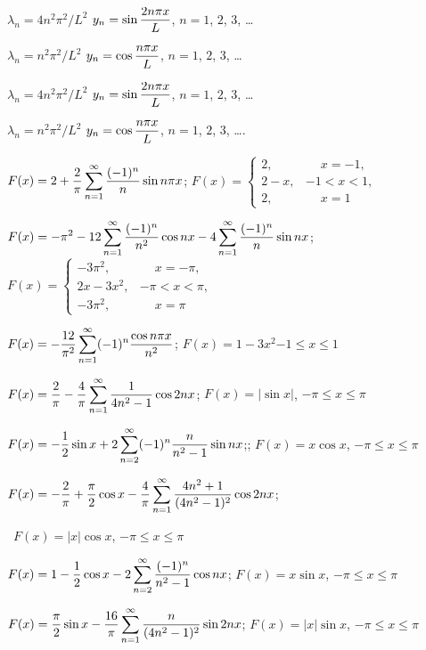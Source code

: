 $\lambda_n=4n^2\pi^2/L^2$   $y_n=\displaystyle\sin\frac{2n\pi x}{L}$,
$n=1$, $2$, $3$, \dots


$\lambda_n=n^2\pi^2/L^2$    $y_n=\displaystyle\cos\frac{ n\pi x}{L}$,
$n=1$, $2$, $3$, \dots

$\lambda_n=4n^2\pi^2/L^2$    $y_n=\displaystyle\sin\frac{2n\pi x}{L}$,
$n=1$, $2$, $3$, \dots

$\lambda_n=n^2\pi^2/L^2$    $y_n=\displaystyle\cos\frac{n\pi
x}{L}$, $n=1$, $2$, $3$, \dots.



$F(x)=\displaystyle2+\frac{2}{\pi}\sum_{n=1}^\infty\frac{(-1)^n}{n}\sin n\pi x$;  \quad
$F(x)=
\begin{cases}
2,&\phantom{-}x=-1,\\2-x,&-1<x<1,\\2,&\phantom{-}x=1
\end{cases}$

$F(x)=\displaystyle-\pi^2-12\sum_{n=1}^\infty\frac{(-1)^n}{n^2}\cos nx
-4\sum_{n=1}^\infty\frac{(-1)^n}{n}\sin nx$; $F(x)=
\begin{cases}
-3\pi^2,&\phantom{-}x=-\pi,\\2x-3x^2,&-\pi<x<\pi,\\
-3\pi^2,&\phantom{-}x=\pi
\end{cases}$

$F(x)=-\displaystyle\frac{12}{\pi^2}\sum_{n=1}^\infty(-1)^n\frac{\cos n\pi x}{n^2}$;  \quad $F(x)=1-3x^2$\quad$-1\le x\le 1$

$F(x)=\displaystyle\frac{2}{\pi}-\frac{4}{\pi}\sum_{n=1}^\infty\frac{1}{4n^2-1}\cos2nx$;
\quad $F(x)=|\sin x|$, $-\pi\le x\le\pi$

 $F(x)=\displaystyle-\frac{1}{2}\sin x+2\sum_{n=2}^\infty(-1)^n
\frac{n}{n^2-1}\sin nx$;;  \quad
$F(x)=x\cos x$, $-\pi\le x\le\pi$

$F(x)=\displaystyle-\frac{2}{\pi}+\frac{\pi}{2}\cos x-\frac{4}{\pi}
\sum_{n=1}^\infty\frac{4n^2+1}{(4n^2-1)^2}\cos 2nx$;

\quad\,  $F(x)=|x|\cos x$, $-\pi\le x\le\pi$

$F(x)=\displaystyle1-\frac{1}{2}\cos x-2\sum_{n=2}^\infty\frac{(-1)^n}{n^2-1}\cos
nx$;  \quad $F(x)=x\sin x$, $-\pi\le x\le\pi$

$F(x)=\displaystyle\frac{\pi}{2}\sin x-\frac{16}{\pi}
\sum_{n=1}^\infty\frac{n}{(4n^2-1)^2}\sin 2nx$;  \quad
 $F(x)=|x|\sin x$, $-\pi\le x\le\pi$

